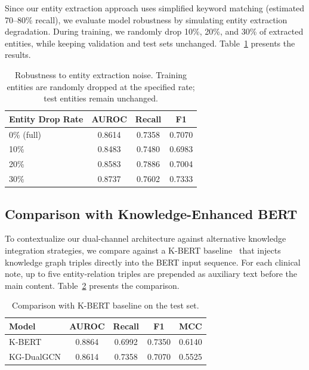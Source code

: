 \documentclass[11pt,onecolumn,a4paper]{article}
\begin{document}
Since our entity extraction approach uses simplified keyword matching (estimated 70--80\% recall), we evaluate model robustness by simulating entity extraction degradation. During training, we randomly drop 10\%, 20\%, and 30\% of extracted entities, while keeping validation and test sets unchanged. Table~\ref{tab:robustness} presents the results.

\begin{table}[H]
\centering
\caption{Robustness to entity extraction noise. Training entities are randomly dropped at the specified rate; test entities remain unchanged.}
\label{tab:robustness}
\begin{tabular}{lccc}
\toprule
Entity Drop Rate & AUROC & Recall & F1 \\
\midrule
0\% (full) & 0.8614 & 0.7358 & 0.7070 \\
10\% & 0.8483 & 0.7480 & 0.6983 \\
20\% & 0.8583 & 0.7886 & 0.7004 \\
30\% & 0.8737 & 0.7602 & 0.7333 \\
\bottomrule
\end{tabular}
\end{table}

\subsection{Comparison with Knowledge-Enhanced BERT}

To contextualize our dual-channel architecture against alternative knowledge integration strategies, we compare against a K-BERT baseline~\cite{liu2020kbert} that injects knowledge graph triples directly into the BERT input sequence. For each clinical note, up to five entity-relation triples are prepended as auxiliary text before the main content. Table~\ref{tab:kbert} presents the comparison.

\begin{table}[H]
\centering
\caption{Comparison with K-BERT baseline on the test set.}
\label{tab:kbert}
\begin{tabular}{lcccc}
\toprule
Model & AUROC & Recall & F1 & MCC \\
\midrule
K-BERT & 0.8864 & 0.6992 & 0.7350 & 0.6140 \\
KG-DualGCN & 0.8614 & 0.7358 & 0.7070 & 0.5525 \\
\bottomrule
\end{tabular}
\end{table}

\end{document}
